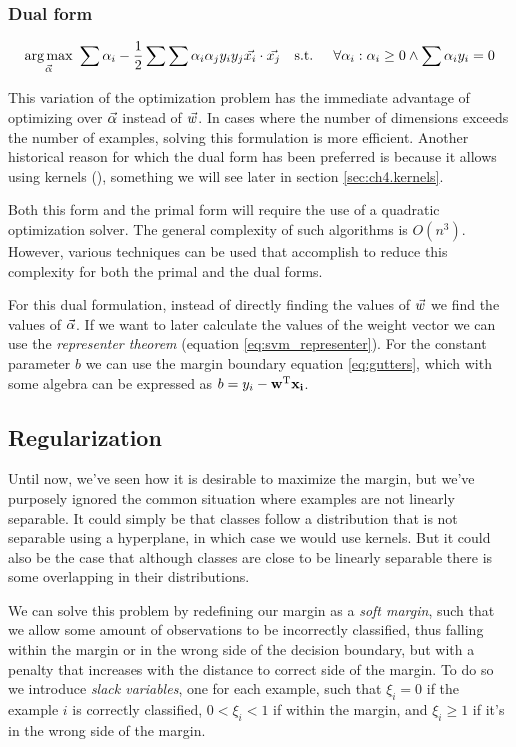\subsubsection*{Dual form}
\begin{align}
    \underset{\vec{\alpha}}{\text{arg} \max}\ \sum \alpha_i - \frac{1}{2} \sum \sum \alpha_i \alpha_j y_i y_j \vec{x_i} \cdot \vec{x_j}
    \text{\quad s.t. \quad} \forall \alpha_i : \alpha_i \ge 0 \land \sum \alpha_i y_i = 0
\end{align}

This variation of the optimization problem has the immediate advantage of op\-ti\-miz\-ing over $\vec{\alpha}$ instead of $\vec{w}$. In cases where the number of dimensions exceeds the number of examples, solving this formulation is more efficient. Another historical reason for which the dual form has been preferred is because it allows using kernels (\cite{chapelle_training_2007}), something we will see later in section \ref{sec:ch4.kernels}.

Both this form and the primal form will require the use of a quadratic op\-ti\-miza\-tion solver. The general complexity of such algorithms is $O(n^3)$. However, various techniques can be used that accomplish to reduce this complexity for both the primal and the dual forms.

For this dual formulation, instead of directly finding the values of $\vec{w}$ we find the values of $\vec{\alpha}$. If we want to later calculate the values of the weight vector we can use the \emph{representer theorem} (equation \ref{eq:svm_representer}). For the constant parameter $b$ we can use the margin boundary equation \ref{eq:gutters}, which with some algebra can be expressed as $b = y_i - \mathbf{w^{\text{T}}}\mathbf{x_i}$.

\subsection{Regularization}

Until now, we've seen how it is desirable to maximize the margin, but we've pur\-pose\-ly ignored the common situation where examples are not linearly separable. It could simply be that classes follow a distribution that is not separable using a hyperplane, in which case we would use kernels. But it could also be the case that although classes are close to be linearly separable there is some overlapping in their distributions.  

We can solve this problem by redefining our margin as a \emph{soft margin}, such that we allow some amount of observations to be incorrectly classified, thus falling within the margin or in the wrong side of the decision boundary, but with a penalty that increases with the distance to correct side of the margin. To do so we introduce \emph{slack variables}, one for each example, such that $\xi_i = 0$ if the example $i$ is correctly classified, $0 < \xi_i < 1$ if within the margin, and $\xi_i \ge 1$ if it's in the wrong side of the margin.


